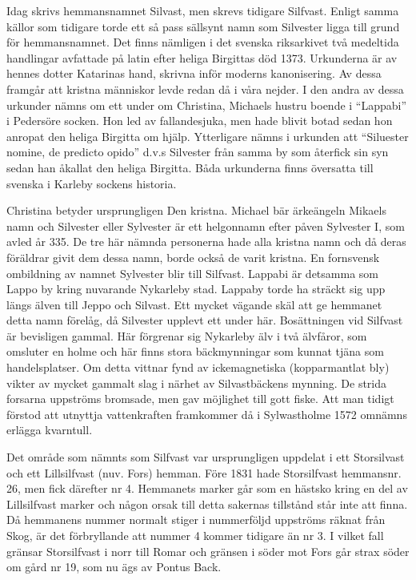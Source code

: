 %


Idag skrivs hemmansnamnet Silvast, men skrevs tidigare Silfvast. Enligt samma källor som tidigare torde ett så pass sällsynt namn som Silvester ligga till grund för hemmansnamnet. Det finns nämligen i det svenska riksarkivet två medeltida handlingar avfattade på latin efter heliga Birgittas död 1373. Urkunderna är av hennes dotter Katarinas hand, skrivna inför moderns kanonisering. Av dessa framgår att kristna människor levde redan då i våra nejder. I den andra av dessa urkunder nämns om ett under om Christina, Michaels hustru boende i ``Lappabi'' i Pedersöre socken. Hon led av fallandesjuka, men hade blivit botad sedan hon anropat den heliga Birgitta om hjälp. Ytterligare nämns i urkunden att ``Siluester nomine, de predicto opido'' d.v.s Silvester från samma by som återfick sin syn sedan han åkallat den heliga Birgitta. Båda urkunderna finns översatta till svenska i Karleby sockens historia.

Christina betyder ursprungligen Den kristna. Michael bär ärkeängeln Mikaels namn och Silvester eller Sylvester är ett helgonnamn efter påven Sylvester I, som avled år 335. De tre här nämnda personerna hade alla kristna namn och då deras föräldrar givit dem dessa namn, borde också de varit kristna. En fornsvensk ombildning av namnet Sylvester blir till Silfvast. Lappabi är detsamma som Lappo by kring nuvarande Nykarleby stad. Lappaby torde ha sträckt sig upp längs älven till Jeppo och Silvast. Ett mycket vägande skäl att ge hemmanet detta namn förelåg, då Silvester upplevt ett under här. Bosättningen vid Silfvast är bevisligen gammal. Här förgrenar sig Nykarleby älv i två älvfåror, som omsluter en holme och här finns stora bäckmynningar som kunnat tjäna som handelsplatser. Om detta vittnar fynd av ickemagnetiska (kopparmantlat bly) vikter av mycket gammalt slag i närhet av Silvastbäckens mynning. De strida forsarna uppströms bromsade, men gav möjlighet till gott fiske. Att man tidigt förstod att utnyttja vattenkraften framkommer då  i Sylwastholme 1572 omnämns erlägga kvarntull.

Det område som nämnts som Silfvast var ursprungligen uppdelat i ett Storsilvast och ett Lillsilfvast (nuv. Fors) hemman. Före 1831 hade Storsilfvast hemmansnr. 26, men fick därefter nr 4. Hemmanets marker går som en hästsko kring en del av Lillsilfvast marker och någon orsak till detta sakernas tillstånd står inte att finna. Då hemmanens nummer normalt stiger i nummerföljd uppströms räknat från Skog, är det förbryllande att nummer 4 kommer tidigare än nr 3. I vilket fall gränsar Storsilfvast i norr till Romar och gränsen i söder mot Fors går strax söder om gård nr 19, som nu ägs av Pontus Back.

